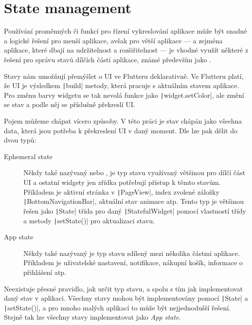 \section{State management}

Používání proměnných či funkcí pro řízení vykreslování aplikace může být
snadné a logické řešení pro menší aplikace,
avšak pro větší aplikace
--- a zejména aplikace, které dbají na udržitelnost a rozšiřitelnost ---
je vhodné využít některé z řešení pro správu stavů dílčích částí aplikace,
známé především jako . \cite{flutter_state_mgmt_simple}
 
Stavy nám umožňují přemýšlet o UI ve Flutteru deklarativně.
Ve Flutteru platí,
že UI je výsledkem \texttt|build| metody,
která pracuje s aktuálním stavem aplikace.
Pro změnu barvy widgetu se tak nevolá funkce jako
\texttt|widget.setColor|,
ale změní se stav a podle něj se příslušně překreslí UI.

Pojem  můžeme chápat vícero způsoby.
V této práci je stav chápán jako všechna data,
která jsou potřeba k překreslení UI v daný moment.
Dle \cite{flutter_state_mgmt_ephemeral_vs_app} \cite{flutter_state_mgmt_declarative} lze pak dělit do dvou typů:

\begin{description}
    \item[Ephemeral state] Někdy také nazývaný  nebo
,
je typ stavu využívaný většinou pro dílčí část UI
a ostatní widgety jen zřídka potřebují přístup k těmto stavům.
Příkladem je aktivní stránka v \texttt|PageView|,
index zvolené záložky \texttt|BottomNavigationBar|,
aktuální stav animace atp.
Tento typ je většinou řešen jako \texttt|State| třída pro daný
\texttt|StatefulWidget| pomocí vlastností třídy a metody
\texttt|setState()| pro aktualizaci stavu.
    \item[App state] Někdy také nazývaný  je typ stavu
sdílený mezi několika částmi aplikace.
Příkladem je uživatelské nastavení, notifikace, nákupní košík,
informace o přihlášení atp.
\end{description}

Neexistuje přesné pravidlo,
jak určit typ stavu,
a spolu s tím jak implementovat daný stav v aplikaci.
Všechny stavy mohou být implementovány pomocí \texttt|State| a
\texttt|setState()|,
a pro mnoho malých aplikací to může být nejjednodušší řešení.
Stejně tak lze všechny stavy implementovat jako \emph{App state}.

